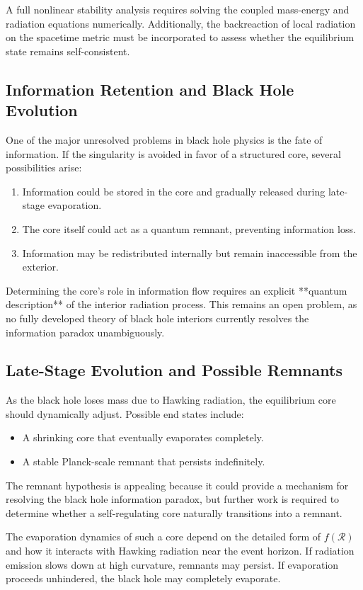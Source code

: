 A full nonlinear stability analysis requires solving the coupled mass-energy and radiation equations numerically. Additionally, the backreaction of local radiation on the spacetime metric must be incorporated to assess whether the equilibrium state remains self-consistent.

\subsection{Information Retention and Black Hole Evolution}
One of the major unresolved problems in black hole physics is the fate of information. If the singularity is avoided in favor of a structured core, several possibilities arise:
\begin{enumerate}
    \item Information could be stored in the core and gradually released during late-stage evaporation.
    \item The core itself could act as a quantum remnant, preventing information loss.
    \item Information may be redistributed internally but remain inaccessible from the exterior.
\end{enumerate}
Determining the core’s role in information flow requires an explicit **quantum description** of the interior radiation process. This remains an open problem, as no fully developed theory of black hole interiors currently resolves the information paradox unambiguously.

\subsection{Late-Stage Evolution and Possible Remnants}
As the black hole loses mass due to Hawking radiation, the equilibrium core should dynamically adjust. Possible end states include:
\begin{itemize}
    \item A shrinking core that eventually evaporates completely.
    \item A stable Planck-scale remnant that persists indefinitely.
\end{itemize}
The remnant hypothesis is appealing because it could provide a mechanism for resolving the black hole information paradox, but further work is required to determine whether a self-regulating core naturally transitions into a remnant.

The evaporation dynamics of such a core depend on the detailed form of \( f(\mathcal{R}) \) and how it interacts with Hawking radiation near the event horizon. If radiation emission slows down at high curvature, remnants may persist. If evaporation proceeds unhindered, the black hole may completely evaporate.

